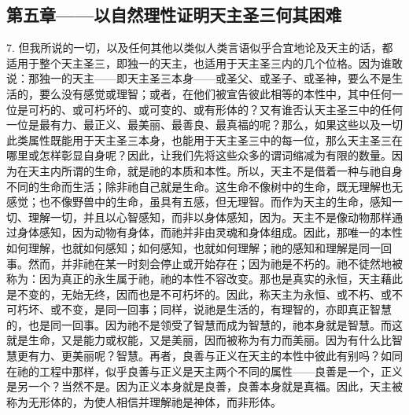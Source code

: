 
\subsection{第五章——以自然理性证明天主圣三何其困难}

7. 但我所说的一切，以及任何其他以类似人类言语似乎合宜地论及天主的话，都适用于整个天主圣三，即独一的天主，也适用于天主圣三内的几个位格。因为谁敢说：那独一的天主——即天主圣三本身——或圣父、或圣子、或圣神，要么不是生活的，要么没有感觉或理智；或者，在他们被宣告彼此相等的本性中，其中任何一位是可朽的、或可朽坏的、或可变的、或有形体的？又有谁否认天主圣三中的任何一位是最有力、最正义、最美丽、最善良、最真福的呢？那么，如果这些以及一切此类属性既能用于天主圣三本身，也能用于天主圣三中的每一位，那么天主圣三在哪里或怎样彰显自身呢？因此，让我们先将这些众多的谓词缩减为有限的数量。因为在天主内所谓的生命，就是祂的本质和本性。所以，天主不是借着一种与祂自身不同的生命而生活；除非祂自己就是生命。这生命不像树中的生命，既无理解也无感觉；也不像野兽中的生命，虽具有五感，但无理智。而作为天主的生命，感知一切、理解一切，并且以心智感知，而非以身体感知，因为。天主不是像动物那样通过身体感知，因为动物有身体，而祂并非由灵魂和身体组成。因此，那唯一的本性如何理解，也就如何感知；如何感知，也就如何理解；祂的感知和理解是同一回事。然而，并非祂在某一时刻会停止或开始存在；因为祂是不朽的。祂不徒然地被称为：因为真正的永生属于祂，祂的本性不容改变。那也是真实的永恒，天主藉此是不变的，无始无终，因而也是不可朽坏的。因此，称天主为永恒、或不朽、或不可朽坏、或不变，是同一回事；同样，说祂是生活的，有理智的，亦即真正智慧的，也是同一回事。因为祂不是领受了智慧而成为智慧的，祂本身就是智慧。而这就是生命，又是能力或权能，又是美丽，因而被称为有力而美丽。因为有什么比智慧更有力、更美丽呢？智慧。再者，良善与正义在天主的本性中彼此有别吗？如同在祂的工程中那样，似乎良善与正义是天主两个不同的属性——良善是一个，正义是另一个？当然不是。因为正义本身就是良善，良善本身就是真福。因此，天主被称为无形体的，为使人相信并理解祂是神体，而非形体。\par

